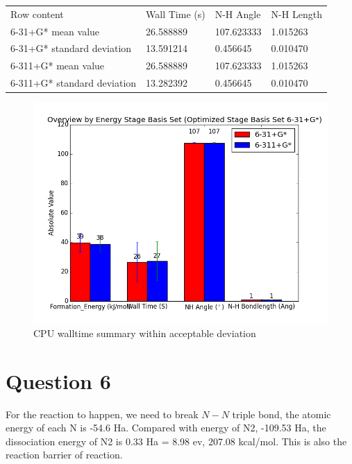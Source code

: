 \documentclass{article}
\begin{document}
\begin{tabular}{llll}
Row content & Wall Time (s) & N-H Angle & N-H Length\\
6-31+G* mean value & 26.588889 & 107.623333 & 1.015263 \\
6-31+G* standard deviation & 13.591214 &   0.456645 & 0.010470\\ 
6-311+G* mean value & 26.588889 & 107.623333 & 1.015263 \\
6-311+G* standard deviation & 13.282392 &  0.456645 & 0.010470\\ 
\end{tabular}

\begin{figure}[ht]
\includegraphics[width=1.2\textwidth]{Basis_Set_6_31_1st.png}
\caption{CPU walltime summary within acceptable deviation}
\label{fig:6_31}
\end{figure}


\section{Question 6}

For the reaction to happen, we need to break $N-N$ triple bond, the atomic energy of each N is -54.6 Ha. Compared with energy of N2, -109.53 Ha, the dissociation energy of N2 is 0.33 Ha = 8.98 ev, 207.08 kcal/mol. This is also the reaction barrier of reaction. 







\end{document}
